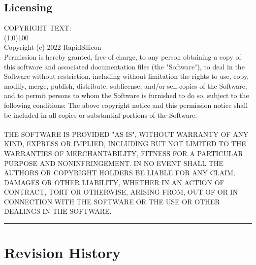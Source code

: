 \documentclass[phv, 11pt ]{SelfArx} %
\begin{document}
{\subsection*{\centering \fontsize{14}{16}\selectfont Licensing}
COPYRIGHT TEXT:\\
\line(1,0){100}\\

Copyright (c) 2022 RapidSilicon\\

Permission is hereby granted, free of charge, to any person obtaining a copy of
this software and associated documentation files (the "Software"), to deal in
the Software without restriction, including without limitation the rights to
use, copy, modify, merge, publish, distribute, sublicense, and/or sell copies of
the Software, and to permit persons to whom the Software is furnished to do so,
subject to the following conditions: The above copyright notice and this
permission notice shall be included in all copies or substantial portions of the
Software.
\\ \\
THE SOFTWARE IS PROVIDED "AS IS", WITHOUT WARRANTY OF ANY KIND, EXPRESS OR
IMPLIED, INCLUDING BUT NOT LIMITED TO THE WARRANTIES OF MERCHANTABILITY, FITNESS
FOR A PARTICULAR PURPOSE AND NONINFRINGEMENT. IN NO EVENT SHALL THE AUTHORS OR
COPYRIGHT HOLDERS BE LIABLE FOR ANY CLAIM, DAMAGES OR OTHER LIABILITY, WHETHER
IN AN ACTION OF CONTRACT, TORT OR OTHERWISE, ARISING FROM, OUT OF OR IN
CONNECTION WITH THE SOFTWARE OR THE USE OR OTHER DEALINGS IN THE SOFTWARE.
\par\noindent\rule{\textwidth}{0.4pt}



% 




\raggedright%


\newpage
\section*{\hfill  Revision History}




}
\end{document}
